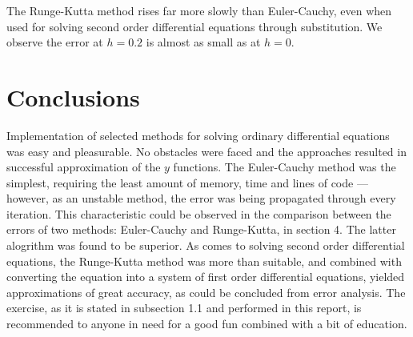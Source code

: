 \documentclass[a4paper,12pt]{article}
\begin{document}
The Runge-Kutta method rises far more slowly than Euler-Cauchy, even when used for solving second order differential equations through substitution. We observe the error at $h = 0.2$ is almost as small as at $h = 0$. 

\section{Conclusions}
Implementation of selected methods for solving ordinary differential equations was easy and pleasurable. No obstacles were faced and the approaches resulted in successful approximation of the $y$ functions. The Euler-Cauchy method was the simplest, requiring the least amount of memory, time and lines of code --- however, as an unstable method, the error was being propagated through every iteration. This characteristic could be observed in the comparison between the errors of two methods: Euler-Cauchy and Runge-Kutta, in section 4. The latter alogrithm was found to be superior. As comes to solving second order differential equations, the Runge-Kutta method was more than suitable, and combined with converting the equation into a system of first order differential equations, yielded approximations of great accuracy, as could be concluded from error analysis. The exercise, as it is stated in subsection 1.1 and performed in this report, is recommended to anyone in need for a good fun combined with a bit of education.
\end{document}
